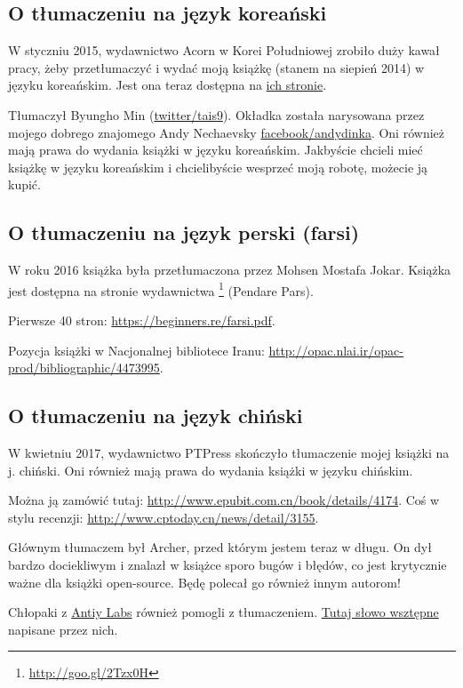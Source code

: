 



\subsection*{O tłumaczeniu na język koreański}

W styczniu 2015, wydawnictwo Acorn w Korei Południowej zrobiło duży kawał pracy, żeby przetłumaczyć i wydać moją książkę  (stanem na siepień 2014) w języku koreańskim.
Jest ona teraz dostępna na \href{http://go.yurichev.com/17343}{ich stronie}.

\iffalse
\begin{figure}[H]
\centering
\texttt{[image: acorn\_cover.jpg]}
\end{figure}
\fi

Tłumaczył Byungho Min (\href{http://go.yurichev.com/17344}{twitter/tais9}).
Okładka została narysowana przez mojego dobrego znajomego Andy Nechaevsky
\href{http://go.yurichev.com/17023}{facebook/andydinka}.
Oni również mają prawa do wydania książki w języku koreańskim.
Jakbyście chcieli mieć  książkę w języku koreańskim i chcielibyście wesprzeć moją robotę, możecie ją kupić.

\subsection*{O tłumaczeniu na język perski (farsi)}

W roku 2016 książka była przetłumaczona przez Mohsen Mostafa Jokar.
Książka jest dostępna na stronie wydawnictwa \footnote{\url{http://goo.gl/2Tzx0H}} (Pendare Pars).

Pierwsze 40 stron: \url{https://beginners.re/farsi.pdf}.

Pozycja książki w Nacjonalnej bibliotece Iranu: \url{http://opac.nlai.ir/opac-prod/bibliographic/4473995}.

\subsection*{O tłumaczeniu na język chiński}

W kwietniu 2017, wydawnictwo PTPress skończyło tłumaczenie mojej książki na j. chiński. Oni również mają prawa do wydania książki w języku chińskim.

Można ją zamówić tutaj: \url{http://www.epubit.com.cn/book/details/4174}. Coś w stylu recenzji: \url{http://www.cptoday.cn/news/detail/3155}.

Głównym tłumaczem był Archer, przed którym jestem teraz w długu.
On dył bardzo dociekliwym i znalazł w książce sporo bugów i błędów, co jest krytycznie ważne dla książki open-source.
Będę polecał go również innym autorom!

Chłopaki z \href{http://www.antiy.net/}{Antiy Labs} również pomogli z tłumaczeniem. \href{http://www.epubit.com.cn/book/onlinechapter/51413}{Tutaj słowo wsztępne} napisane przez nich.


